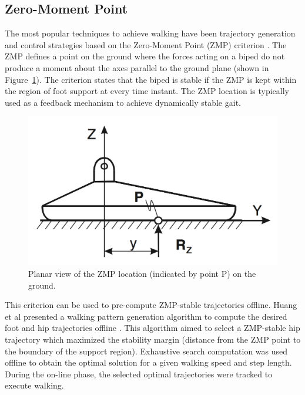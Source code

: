 \subsection{Zero-Moment Point} %
\label{sub:related_zero_moment_point}
The most popular techniques to achieve walking have been trajectory generation and control strategies based on the Zero-Moment Point (ZMP) criterion \cite{Vukobratovic:2004wy}. The ZMP defines a point on the ground where the forces acting on a biped do not produce a moment about the axes parallel to the ground plane (shown in Figure~\ref{fig:zmp}). The criterion states that the biped is stable if the ZMP is kept within the region of foot support at every time instant. The ZMP location is typically used as a feedback mechanism to achieve dynamically stable gait.  

\begin{figure}[!h]
	\begin{center}
    \includegraphics[scale=0.3]{fig/background/zmp.png}
	\end{center}
  \caption{Planar view of the ZMP location (indicated by point P) on the ground.}
  \label{fig:zmp}
\end{figure}

This criterion can be used to pre-compute ZMP-stable trajectories offline. Huang et al presented a walking pattern generation algorithm to compute the desired foot and hip trajectories offline \cite{HuangEtAlTRA2001}. This algorithm aimed to select a ZMP-stable hip trajectory which maximized the stability margin (distance from the ZMP point to the boundary of the support region). Exhaustive search computation was used offline to obtain the optimal solution for a given walking speed and step length. During the on-line phase, the selected optimal trajectories were tracked to execute walking.

